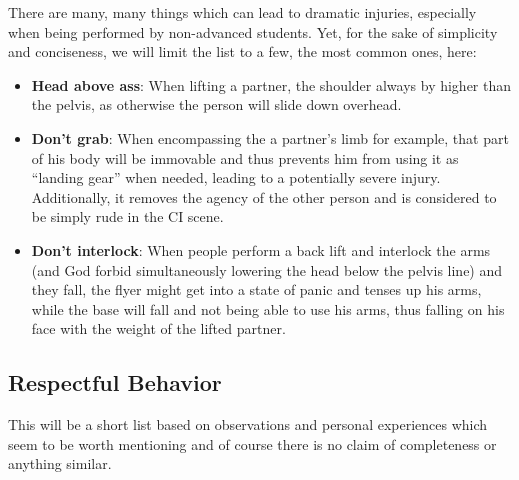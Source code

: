 There are many, many things which can lead to dramatic injuries, especially when being performed by non-advanced students.
Yet, for the sake of simplicity and conciseness, we will limit the list to a few, the most common ones, here:

\begin{itemize}
    \item \textbf{Head above ass}: When lifting a partner, the shoulder always by higher than the pelvis, as otherwise the person will slide down overhead.
    \item \textbf{Don't grab}: When encompassing the a partner's limb for example, that part of his body will be immovable and thus prevents him from using it as ``landing gear'' when needed, leading to a potentially severe injury.
    Additionally, it removes the agency of the other person and is considered to be simply rude in the CI scene.
    \item \textbf{Don't interlock}: When people perform a back lift and interlock the arms (and God forbid simultaneously lowering the head below the pelvis line) and they fall, the flyer might get into a state of panic and tenses up his arms, while the base will fall and not being able to use his arms, thus falling on his face with the weight of the lifted partner.
\end{itemize}

\subsection{Respectful Behavior}\label{subsec:respectful-behavior}

This will be a short list based on observations and personal experiences which seem to be worth mentioning and of course there is no claim of completeness or anything similar.

